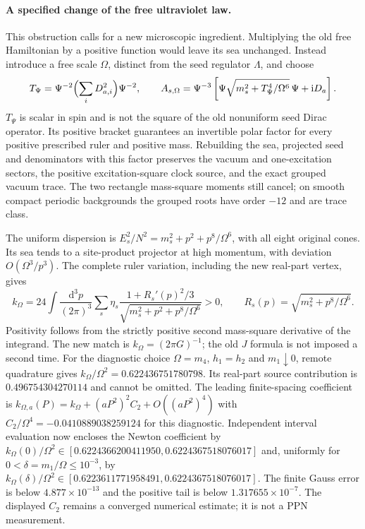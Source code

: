 \paragraph{A specified change of the free ultraviolet law.}
This obstruction calls for a new microscopic ingredient. Multiplying
the old free Hamiltonian by a positive function would leave its sea
unchanged. Instead introduce a free scale $\Omega$, distinct from the
seed regulator $\Lambda$, and choose
\[
 T_\Psi=\Psi^{-2}\Bigl(\sum_iD_{a,i}^2\Bigr)\Psi^{-2},\qquad
 A_{s,\Omega}=\Psi^{-3}\left[
 \Psi\sqrt{m_s^2+T_\Psi^4/\Omega^6}\,\Psi+\mathrm iD_a\right].
\]
$T_\Psi$ is scalar in spin and is not the square of the old nonuniform
seed Dirac operator. Its positive bracket guarantees an invertible polar
factor for every positive prescribed ruler and positive mass. Rebuilding
the sea, projected seed and denominators with this factor preserves the
vacuum and one-excitation sectors, the positive excitation-square clock
source, and the exact grouped vacuum trace. The two rectangle mass-square
moments still cancel; on smooth compact periodic backgrounds the grouped
roots have order $-12$ and are trace class.

The uniform dispersion is
$E_s^2/N^2=m_s^2+p^2+p^8/\Omega^6$, with all eight original cones.
Its sea tends to a site-product projector at high momentum, with
deviation $O(\Omega^3/p^3)$. The complete ruler variation, including the
new real-part vertex, gives
\[
 k_\Omega=24\int\frac{\mathrm d^3p}{(2\pi)^3}
 \sum_s\eta_s\frac{1+R_s'(p)^2/3}{\sqrt{m_s^2+p^2+p^8/\Omega^6}}>0,
 \qquad R_s(p)=\sqrt{m_s^2+p^8/\Omega^6}.
\]
Positivity follows from the strictly positive second mass-square
derivative of the integrand. The new match is
$k_\Omega=(2\pi G)^{-1}$; the old $J$ formula is not imposed a second
time. For the diagnostic choice $\Omega=m_4$, $h_1=h_2$ and
$m_1\downarrow0$, remote quadrature gives
$k_\Omega/\Omega^2=0.622436751780798$. Its real-part source contribution
is $0.496754304270114$ and cannot be omitted. The leading finite-spacing
coefficient is
$k_{\Omega,a}(P)=k_\Omega+(aP^2)^2C_2+O((aP^2)^4)$ with
$C_2/\Omega^4=-0.0410889038259124$ for this diagnostic. Independent
interval evaluation now encloses the Newton coefficient by
$k_\Omega(0)/\Omega^2\in
[0.6224366200411950,0.6224367518076017]$ and, uniformly for
$0<\delta=m_1/\Omega\leq10^{-3}$, by
$k_\Omega(\delta)/\Omega^2\in
[0.6223611771958491,0.6224367518076017]$.
The finite Gauss error is below $4.877\times10^{-13}$ and the positive
tail is below $1.317655\times10^{-7}$. The displayed $C_2$ remains a
converged numerical estimate; it is not a PPN measurement.

